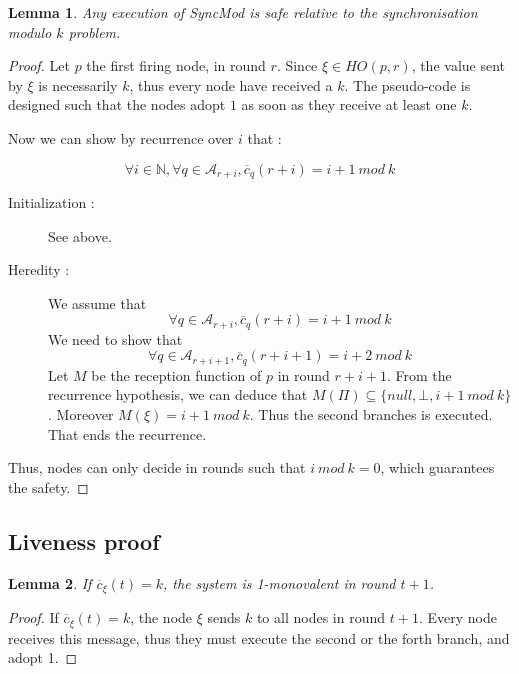 \documentclass{article}
\newtheorem{lemma}{Lemma}[section]
\begin{document}
\begin{lemma}\label{lem:safety}
	Any execution of SyncMod is safe relative to the synchronisation modulo $k$ problem.
\end{lemma}
\begin{proof}
	Let $p$ the first firing node, in round $r$.
	Since $\xi \in HO(p,r)$, the value sent by $\xi$ is necessarily $k$, thus every node have received a $k$.
	The pseudo-code is designed such that the nodes adopt $1$ as soon as they receive at least one $k$.

	Now we can show by recurrence over $i$ that :

	$$\forall i \in \mathds{N}, \forall q \in \mathcal{A}_{r+i}, \overline{c}_q(r+i) = i + 1~mod~k$$

	\begin{description}
		\item[Initialization :] See above.
		\item[Heredity :] We assume that 
			$$\forall q \in \mathcal{A}_{r+i}, \overline{c}_q(r+i) = i + 1~mod~k$$
	We need to show that 
			$$\forall q \in \mathcal{A}_{r+i+1}, \overline{c}_q(r+i+1) = i + 2~mod~k$$
	Let $M$ be the reception function of $p$ in round $r+i+1$.
			From the recurrence hypothesis, we can deduce that $M(\Pi) \subseteq \{null, \bot, i+1~mod~k\}$.
			Moreover $M(\xi) = i+1~mod~k$.
			Thus the second branches is executed. That ends the recurrence.
	\end{description}

	Thus, nodes can only decide in rounds such that $i~mod~k = 0$, which guarantees the safety.
\end{proof}

\subsection{Liveness proof}

\begin{lemma}\label{lem:k_mono}
	If $\overline{c}_\xi(t) = k$, the system is 1-monovalent in round $t+1$.
\end{lemma}
\begin{proof}
	If $\overline{c}_\xi(t) = k$, the node $\xi$ sends $k$ to all nodes in round $t+1$.
	Every node receives this message, thus they must execute the second or the forth branch, and adopt 1.
\end{proof}
\end{document}
